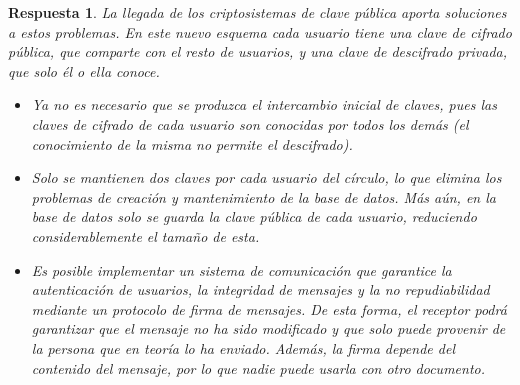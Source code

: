 \documentclass[
  a4paper,
  spanish,
  12pt,
]{scrartcl}
\theoremstyle{ejercicio-style}
\theoremstyle{remark-style}
\newtheorem*{sol}{Respuesta}
\theoremstyle{teorema-style}
\begin{document}
\begin{sol}
La llegada de los criptosistemas de clave pública aporta soluciones a estos problemas. En este nuevo esquema cada usuario tiene una clave de cifrado pública, que comparte con el resto de usuarios, y una clave de descifrado privada, que solo él o ella conoce.

\begin{itemize}
  \item Ya no es necesario que se produzca el intercambio inicial de claves, pues las claves de cifrado de cada usuario son conocidas por todos los demás (el conocimiento de la misma no permite el descifrado).

  \item Solo se mantienen dos claves por cada usuario del círculo, lo que elimina los problemas de creación y mantenimiento de la base de datos. Más aún, en la base de datos solo se guarda la clave pública de cada usuario, reduciendo considerablemente el tamaño de esta.

\item Es posible implementar un sistema de comunicación que garantice la \textit{autenticación} de usuarios, la \textit{integridad} de mensajes y la \textit{no repudiabilidad} mediante un protocolo de firma de mensajes. De esta forma, el receptor podrá garantizar que el mensaje no ha sido modificado y que solo puede provenir de la persona que en teoría lo ha enviado. Además, la firma depende del contenido del mensaje, por lo que nadie puede usarla con otro documento.


\end{itemize}
\end{sol}
\end{document}
